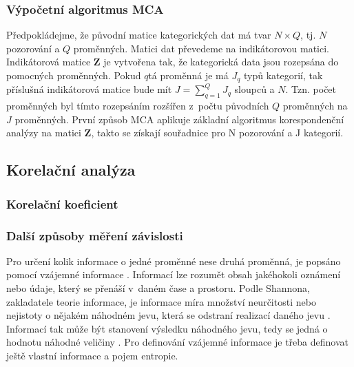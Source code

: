 \subsubsection*{Výpočetní algoritmus MCA}

Předpokládejme, že původní matice kategorických dat má tvar $N\times Q$, tj. $N$ pozorování a $Q$ proměnných. Matici dat převedeme na indikátorovou matici. Indikátorová matice  $\mathbf{Z} $ je vytvořena tak, že kategorická data jsou rozepsána do pomocných proměnných. Pokud $q$tá proměnná je má $J_q$ typů kategorií, tak příslušná indikátorová matice bude mít $J = \sum_{q=1}^{Q}J_q$ sloupců a $N$. Tzn. počet proměnných byl tímto rozepsáním rozšířen z~počtu původních $Q$ proměnných na $J$ proměnných.
První způsob MCA aplikuje základní algoritmus korespondenční analýzy na matici  $\mathbf{Z}$, takto se získají souřadnice pro N pozorování a J kategorií.




\subsection{Korelační analýza}

\subsubsection{Korelační koeficient}
\subsubsection{Další způsoby měření závislosti}

Pro určení kolik informace o jedné proměnné nese druhá proměnná, je popsáno
pomocí vzájemné informace \cite{bib:MI}. Informací lze rozumět obsah jakéhokoli oznámení nebo údaje, který se přenáší v~daném čase a prostoru. Podle Shannona, zakladatele teorie informace, je informace míra množství neurčitosti nebo nejistoty o nějakém náhodném jevu, která se odstraní realizací daného jevu \cite{bib:MI2}. Informací tak může být stanovení výsledku náhodného jevu, tedy se jedná o hodnotu náhodné veličiny \cite{bib:MI}. Pro definování vzájemné informace je třeba definovat ještě vlastní informace a pojem entropie.

